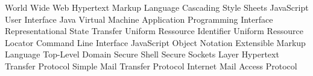 \begin{acronym}[HTML]
			{World Wide Web}
			{Hypertext Markup Language}
			{Cascading Style Sheets}
			{JavaScript}
			{User Interface}
			{Java Virtual Machine}
   			{Application Programming Interface}
	     {Representational State Transfer}
	      {Uniform Ressource Identifier}
	      {Uniform Ressource Locator}
	      {Command Line Interface}
	     {JavaScript Object Notation}
	      {Extensible Markup Language}
			{Top-Level Domain}
			{Secure Shell}
			{Secure Sockets Layer}
			{Hypertext Transfer Protocol}
			{Simple Mail Transfer Protocol}
			{Internet Mail Access Protocol}
\end{acronym}
